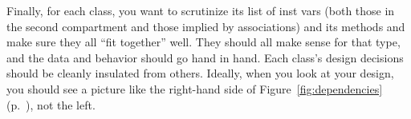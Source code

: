 Finally, for each class, you want to scrutinize its list of inst vars (both
those in the second compartment and those implied by associations) and its
methods and make sure they all ``fit together'' well. They should all make
sense for that type, and the data and behavior should go hand in hand. Each
class's design decisions should be cleanly insulated from others. Ideally, when
you look at your design, you should see a picture like the right-hand side of
Figure~\ref{fig:dependencies} (p.~\pageref{fig:dependencies}), not the left.
